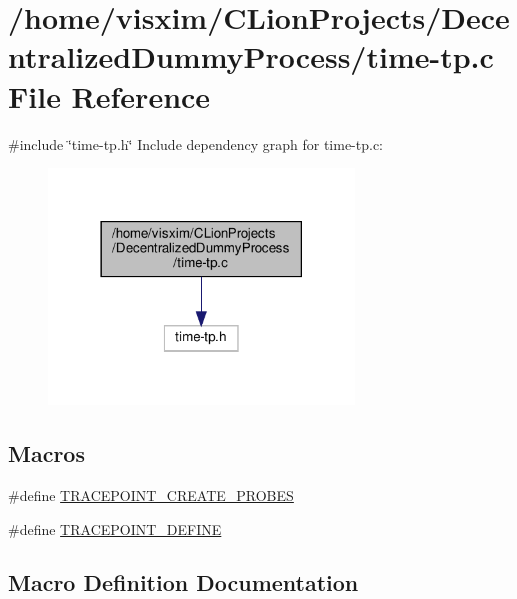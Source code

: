 \hypertarget{time-tp_8c}{}\section{/home/visxim/\+C\+Lion\+Projects/\+Decentralized\+Dummy\+Process/time-\/tp.c File Reference}
\label{time-tp_8c}
{\ttfamily \#include \char`\"{}time-\/tp.\+h\char`\"{}}\newline
Include dependency graph for time-\/tp.c\+:
\nopagebreak
\begin{figure}[H]
\begin{center}
\leavevmode
\includegraphics[width=230pt]{time-tp_8c__incl}
\end{center}
\end{figure}
\subsection*{Macros}
\begin{DoxyCompactItemize}
\item 
\#define \hyperlink{time-tp_8c_aeb980b4a64d9b54d660780a30415b0bc}{T\+R\+A\+C\+E\+P\+O\+I\+N\+T\+\_\+\+C\+R\+E\+A\+T\+E\+\_\+\+P\+R\+O\+B\+ES}
\item 
\#define \hyperlink{time-tp_8c_a71ad37c54f22eb10bdfed4267d53bd79}{T\+R\+A\+C\+E\+P\+O\+I\+N\+T\+\_\+\+D\+E\+F\+I\+NE}
\end{DoxyCompactItemize}


\subsection{Macro Definition Documentation}
\mbox{\label{time-tp_8c_aeb980b4a64d9b54d660780a30415b0bc}} 
